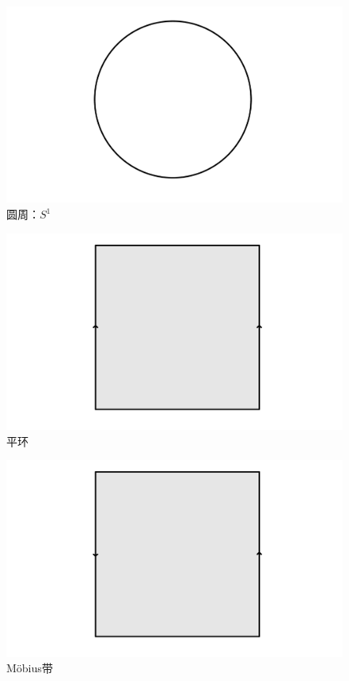 \documentclass[lang = cn, scheme = chinese, thmcnt = section, usesamecnt]{elegantbook}
\begin{document}
\begin{figure}[H]
	\centering
	\caption{圆周：$S^1$}
	\includegraphics[scale = 0.15]{figure/圆周}
\end{figure}

\begin{figure}[H]
	\centering
	\caption{平环}
	\includegraphics[scale = 0.15]{figure/平环}
\end{figure}

\begin{figure}[H]
	\centering
	\caption{Möbius带}
	\includegraphics[scale = 0.15]{figure/Möbius带}
\end{figure}
\end{document}
